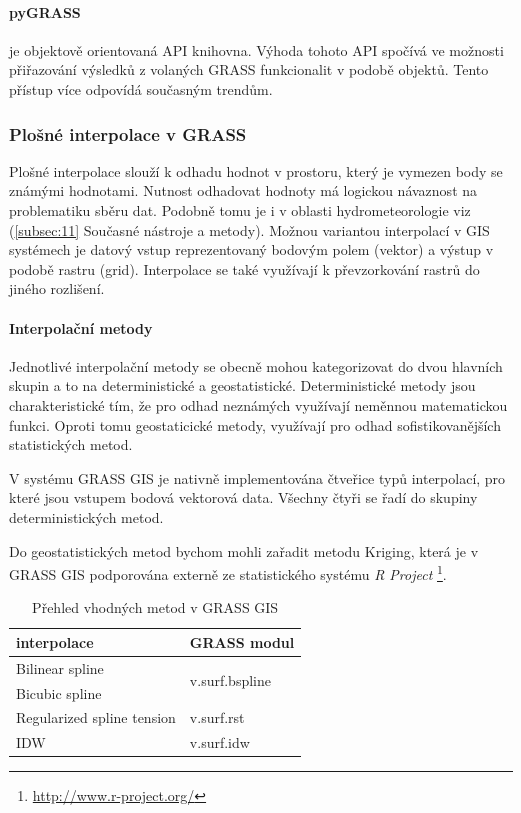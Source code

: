 \documentclass[a4paper,12pt,oneside]{report}
\begin{document}
\paragraph*{pyGRASS} je objektově orientovaná API knihovna. Výhoda
tohoto API spočívá ve možnosti přiřazování výsledků z volaných GRASS
funkcionalit v podobě objektů. Tento přístup více odpovídá současným trendům.

\subsubsection*{Plošné interpolace v GRASS }
\label{sec:plostneinterpolace}
Plošné interpolace slouží k odhadu hodnot v prostoru, který je vymezen 
body se známými hodnotami. Nutnost odhadovat hodnoty má logickou návaznost na
problematiku sběru dat.  Podobně tomu je i v oblasti
hydrometeorologie viz (\ref{subsec:11} Současné nástroje a metody).
 Možnou variantou interpolací v GIS
systémech je datový vstup reprezentovaný bodovým polem (vektor) a
výstup v podobě rastru (grid). Interpolace se také využívají k
převzorkování rastrů do jiného rozlišení.

\paragraph*{ Interpolační metody}
Jednotlivé interpolační metody se obecně mohou kategorizovat do dvou
hlavních skupin a to na deterministické a geostatistické.
Deterministické metody jsou charakteristické tím, že pro odhad
neznámých využívají neměnnou matematickou funkci.  Oproti tomu
geostaticické metody, využívají pro odhad sofistikovanějších statistických metod.

V systému GRASS GIS je nativně implementována čtveřice typů
interpolací, pro které jsou vstupem bodová vektorová data. Všechny
čtyři se řadí do skupiny deterministických metod.

Do geostatistických metod bychom mohli zařadit metodu Kriging, která
je v GRASS GIS podporována externě ze statistického systému \textit{R
  Project} \footnote{\url{http://www.r-project.org/}}.

\begin{table}[h]
\centering
\begin{tabular}{|ll|}
\hline
interpolace & GRASS modul \\ \hline\hline
Bilinear spline & \multirow{2}{*}{v.surf.bspline} \\
Bicubic spline &  \\
Regularized spline tension & v.surf.rst \\
IDW & v.surf.idw \\ \hline
\end{tabular}
\caption{Přehled vhodných metod v GRASS GIS}
\label{my-label}
\end{table}
\end{document}

